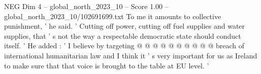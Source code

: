\begin{textsample}{NEG Dim 4 – global\_north\_2023\_10 – Score 1.00 – global\_north\_2023\_10/102691699.txt}
To me it amounts to collective punishment, ' he said. ' Cutting off power, cutting off fuel supplies and water supplies, that ' s not the way a respectable democratic state should conduct itself. ' He added : ' I believe by targeting @ @ @ @ @ @ @ @ @ @ breach of international humanitarian law and I think it ' s very important for us as Ireland to make sure that that voice is brought to the table at EU level. '

\end{textsample}
